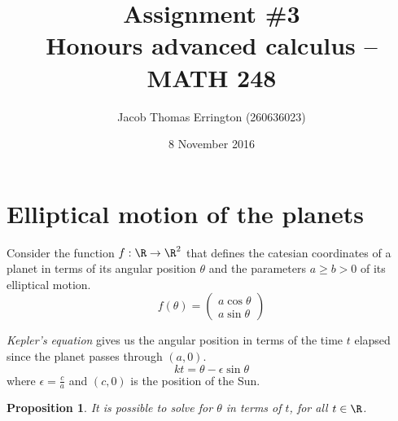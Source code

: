 \documentclass[letterpaper,11pt]{article}
\author{Jacob Thomas Errington (260636023)}
\title{Assignment \#3\\Honours advanced calculus -- MATH 248}
\date{8 November 2016}
\newtheorem{prop}{Proposition}
\newcommand{\parens}[1]{\left(#1\right)}
\begin{document}
\maketitle

\section{Elliptical motion of the planets}

Consider the function $f : \R \to \R^2$ that defines the catesian coordinates
of a planet in terms of its angular position $\theta$ and the parameters
$a \geq b > 0$ of its elliptical motion.
\begin{equation*}
  f(\theta) = \parens{
    \begin{array}{l}
      a \cos \theta \\
      a \sin \theta
    \end{array}
  }
\end{equation*}

\emph{Kepler's equation} gives us the angular position in terms of the time $t$
elapsed since the planet passes through $(a, 0)$.
\begin{equation}
  kt = \theta -\epsilon \sin \theta
  \label{eq:kepler}
\end{equation}
where $\epsilon = \frac{c}{a}$ and $(c, 0)$ is the position of the Sun.

\begin{prop}
  It is possible to solve for $\theta$ in terms of $t$, for all $t \in \R$.
\end{prop}
\end{document}
